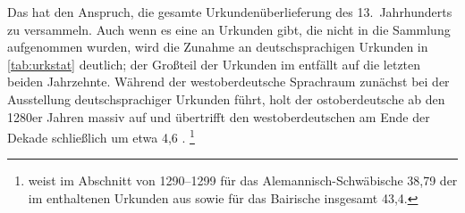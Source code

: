 
Das \CAO{} hat den Anspruch, die gesamte Urkundenüberlieferung des
13.~Jahrhunderts zu versammeln. Auch wenn es eine  an Urkunden
gibt, die nicht in die Sammlung aufgenommen wurden, wird die Zunahme an
deutschsprachigen Urkunden in \cref{tab:urkstat} deutlich; der Großteil der
Urkunden im \CAO{} entfällt auf die letzten beiden Jahrzehnte. Während
der westoberdeutsche Sprachraum zunächst bei der Ausstellung deutschsprachiger
Urkunden führt, holt der ostoberdeutsche ab den 1280er Jahren massiv auf und
übertrifft den westoberdeutschen am Ende der Dekade schließlich um etwa
4,6\pct{} \autocite[46--47]{ganslmayer2012}.%
%
	\footnote{\citet[47]{ganslmayer2012} weist im Abschnitt von 1290--1299 für
		das Alemannisch-Schwäbische 38,79\pct{} der im \CAO{}
		enthaltenen Urkunden aus sowie für das Bairische insgesamt 43,4\pct.
	}

